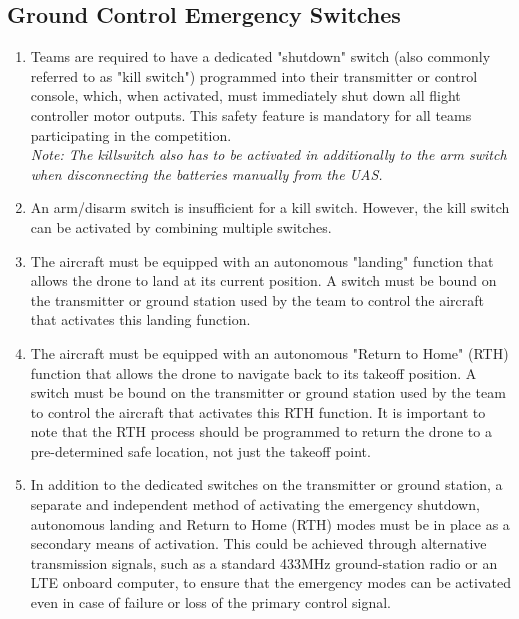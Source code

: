 \documentclass{article}
\begin{document}
\subsection{Ground Control Emergency Switches}
\begin{enumerate}
  \item Teams are required to have a dedicated "shutdown" switch (also commonly referred to as "kill switch") programmed into their transmitter or control console, which, when activated, must immediately shut down all flight controller motor outputs. This safety feature is mandatory for all teams participating in the competition. \\ \emph{Note: The killswitch also has to be activated in additionally to the arm switch when disconnecting the batteries manually from the UAS.}
  \item An arm/disarm switch is insufficient for a kill switch. However, the kill switch can be activated by combining multiple switches.
  \item The aircraft must be equipped with an autonomous "landing" function that allows the drone to land at its current position. A switch must be bound on the transmitter or ground station used by the team to control the aircraft that activates this landing function.  
  \item The aircraft must be equipped with an autonomous "Return to Home" (RTH) function that allows the drone to navigate back to its takeoff position. A switch must be bound on the transmitter or ground station used by the team to control the aircraft that activates this RTH function. It is important to note that the RTH process should be programmed to return the drone to a pre-determined safe location, not just the takeoff point.
  \item In addition to the dedicated switches on the transmitter or ground station, a separate and independent method of activating the emergency shutdown, autonomous landing and Return to Home (RTH) modes must be in place as a secondary means of activation. This could be achieved through alternative transmission signals, such as a standard 433MHz ground-station radio or an LTE onboard computer,  to ensure that the emergency modes can be activated even in case of failure or loss of the primary control signal.
\end{enumerate}
\end{document}
